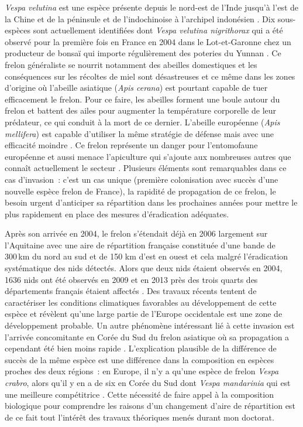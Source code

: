 \emph{Vespa velutina} est une espèce présente depuis le nord-est de
l'Inde jusqu'à l'est de la Chine et de la péninsule et de l'indochinoise
à l'archipel indonésien \citep{Villemant2006}. Dix sous-espèces sont
actuellement identifiées dont \emph{Vespa velutina nigrithorax} qui a
été observé pour la première fois en France en 2004 dans le
Lot-et-Garonne chez un producteur de bonsaï qui importe régulièrement
des poteries du Yunnan \citep{Villemant2006}. Ce frelon généraliste se
nourrit notamment des abeilles domestiques et les conséquences sur les
récoltes de miel sont désastreuses et ce même dans les zones d'origine
où l'abeille asiatique (\emph{Apis cerana}) est pourtant capable de tuer
efficacement le frelon. Pour ce faire, les abeilles forment une boule
autour du frelon et battent des ailes pour augmenter la température
corporelle de leur prédateur, ce qui conduit à la mort de ce dernier.
L'abeille européenne (\emph{Apis mellifera}) est capable d'utiliser la
même stratégie de défense mais avec une efficacité moindre
\citep{Villemant2006}. Ce frelon représente un danger pour l'entomofaune
européenne et aussi menace l'apiculture qui s'ajoute aux nombreuses
autres que connaît actuellement le secteur \citep{Vanbergen2013}.
Plusieurs éléments sont remarquables dans ce cas d'invasion~: c'est un
cas unique (première colonisation avec succès d'une nouvelle espèce
frelon de France), la rapidité de propagation de ce frelon, le besoin
urgent d'anticiper sa répartition dans les prochaines années pour mettre
le plus rapidement en place des mesures d'éradication adéquates.

Après son arrivée en 2004, le frelon s'étendait déjà en 2006 largement
sur l'Aquitaine avec une aire de répartition française constituée d'une
bande de 300 km du nord au sud et de 150 km d'est en ouest
\citep{Villemant2006} et cela malgré l'éradication systématique des nids
détectés. Alors que deux nids étaient observés en 2004, 1636 nids ont
été observés en 2009 et en 2013 près des trois quarts des départements
français étaient affectés \citep{Robinet2016}. Des travaux récents
tentent de caractériser les conditions climatiques favorables au
développement de cette espèce \citep{Villemant2011} et révèlent qu'une
large partie de l'Europe occidentale est une zone de développement
probable. Un autre phénomène intéressant lié à cette invasion est
l'arrivée concomitante en Corée du Sud du frelon asiatique où sa
propagation a cependant été bien moins rapide \citep{Villemant2011}.
L'explication plausible de la différence de succès de la même espèce est
une différence dans la composition en espèces proches des deux régions~:
en Europe, il n'y a qu'une espèce de frelon \emph{Vespa crabro}, alors
qu'il y en a de six en Corée du Sud dont \emph{Vespa mandarinia} qui est
une meilleure compétitrice \citep{Villemant2011}. Cette nécessité de
faire appel à la composition biologique pour comprendre les raisons d'un
changement d'aire de répartition est de ce fait tout l'intérêt des
travaux théoriques menés durant mon doctorat.

